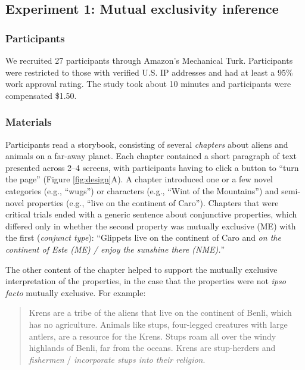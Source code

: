 \documentclass[10pt,letterpaper]{article}
\begin{document}
\subsection{Experiment 1: Mutual exclusivity inference}

\subsubsection{Participants}
We recruited 27 participants through Amazon's Mechanical Turk.
Participants were restricted to those with verified U.S. IP addresses and had at least a 95\% work approval rating. 
The study took about 10 minutes and participants were compensated \$1.50.

\subsubsection{Materials}

Participants read a storybook, consisting of several \emph{chapters} about aliens and animals on a far-away planet.
Each chapter contained a short paragraph of text presented across 2--4 screens, with participants having to click a button to ``turn the page'' (Figure \ref{fig:design}A).
A chapter introduced one or a few novel categories (e.g., ``wugs'') or characters (e.g., ``Wint of the Mountains'') and semi-novel properties (e.g., ``live on the continent of Caro'').
Chapters that were critical trials ended with a generic sentence about conjunctive properties, which differed only in whether the second property was mutually exclusive (ME) with the first (\emph{conjunct type}): ``Glippets live on the continent of Caro and \emph{on the continent of Este (ME) /  enjoy the sunshine there (NME).}''

The other content of the chapter helped to support the mutually exclusive interpretation of the properties, in the case that the properties were not \emph{ipso facto} mutually exclusive. For example: 

\begin{quote}
\small
Krens are a tribe of the aliens that live on the continent of Benli, which has no agriculture. Animals like stups, four-legged creatures with large antlers, are a resource for the Krens. Stups roam all over the windy highlands of Benli, far from the oceans. Krens are stup-herders and \emph{fishermen} / \emph{incorporate stups into their religion}.
\end{quote}
\end{document}
